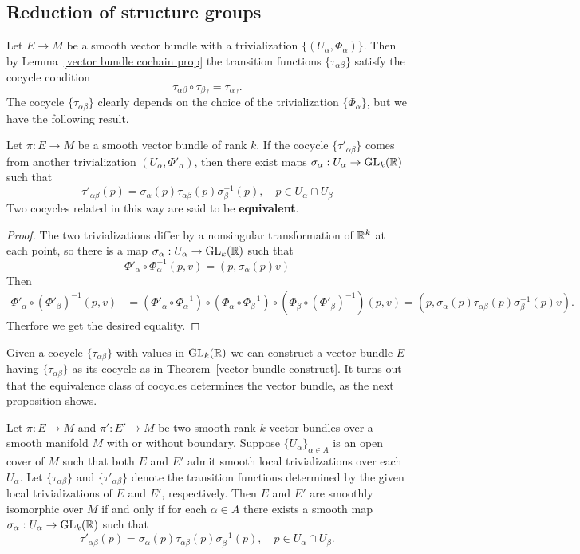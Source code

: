 \subsection{Reduction of structure groups}
Let $E\to M$ be a smooth vector bundle with a trivialization $\{(U_\alpha,\varPhi_{\alpha})\}$. Then by Lemma~\ref{vector bundle cochain prop} the transition functions 
$\{\tau_{\alpha\beta}\}$ satisfy the cocycle condition
\[\tau_{\alpha\beta}\circ\tau_{\beta\gamma}=\tau_{\alpha\gamma}.\]
The cocycle $\{\tau_{\alpha\beta}\}$ clearly depends on the choice of the trivialization $\{\varPhi_\alpha\}$, but we have the following result.
\begin{lemma}\label{vector bundle equivalent transition lem}
Let $\pi:E\to M$ be a smooth vector bundle of rank $k$. If the cocycle $\{\tau'_{\alpha\beta}\}$ comes from another trivialization ${(U_{\alpha},\varPhi'_{\alpha})}$, then there 
exist maps $\sigma_{\alpha}:U_{\alpha}\to \mathrm{GL}_k(\mathbb{R})$ such that
\[\tau'_{\alpha\beta}(p)=\sigma_\alpha(p)\tau_{\alpha\beta}(p)\sigma_\beta^{-1}(p),\quad p\in U_\alpha\cap U_\beta\]
Two cocycles related in this way are said to be \textbf{equivalent}.
\end{lemma}
\begin{proof}
The two trivializations differ by a nonsingular transformation of $\mathbb{R}^k$ at each point, so there is a map $\sigma_\alpha:U_\alpha\to\mathrm{GL}_k(\mathbb{R})$ such that
\[\varPhi'_\alpha\circ\varPhi_\alpha^{-1}(p,v)=(p,\sigma_\alpha(p)v)\]
Then
\begin{align*}
\varPhi'_{\alpha}\circ(\varPhi'_{\beta})^{-1}(p,v)&=(\varPhi'_{\alpha}\circ\varPhi_\alpha^{-1})\circ(\varPhi_\alpha\circ\varPhi_\beta^{-1})\circ(\varPhi_{\beta}\circ(\varPhi'_{\beta})^{-1})(p,v)=(p,\sigma_\alpha(p)\tau_{\alpha\beta}(p)\sigma_\beta^{-1}(p)v).
\end{align*}
Therfore we get the desired equality.
\end{proof}
Given a cocycle $\{\tau_{\alpha\beta}\}$ with values in $\mathrm{GL}_k(\mathbb{R})$ we can construct a vector bundle $E$ having $\{\tau_{\alpha\beta}\}$ as its cocycle as in 
Theorem~\ref{vector bundle construct}. It turns out that the equivalence class of cocycles determines the vector bundle, as the next proposition shows.
\begin{proposition}
Let $\pi:E\to M$ and $\pi':E'\to M$ be two smooth rank-$k$ vector bundles over
a smooth manifold $M$ with or without boundary. Suppose $\{U_\alpha\}_{\alpha\in A}$ is an open cover of $M$ such that both $E$ and $E'$ admit smooth local 
trivializations over each $U_\alpha$. Let $\{\tau_{\alpha\beta}\}$ and $\{\tau'_{\alpha\beta}\}$ denote the transition functions determined by the given local 
trivializations of $E$ and $E'$, respectively. Then $E$ and $E'$ are smoothly isomorphic over $M$ if and only if for each $\alpha\in A$ there exists a smooth map 
$\sigma_\alpha:U_\alpha\to\mathrm{GL}_k(\mathbb{R})$ such that
\[\tau'_{\alpha\beta}(p)=\sigma_\alpha(p)\tau_{\alpha\beta}(p)\sigma_\beta^{-1}(p),\quad p\in U_\alpha\cap U_\beta.\]
\end{proposition}
